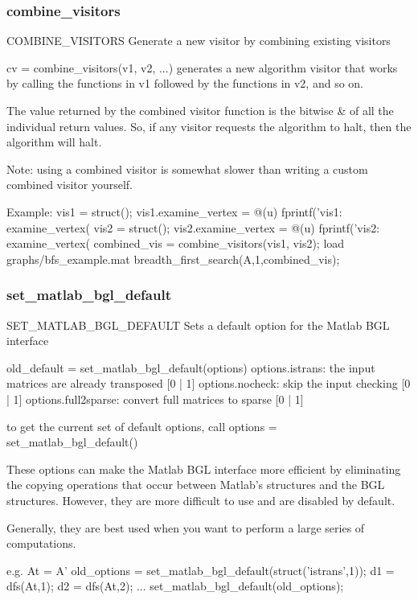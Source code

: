 \subsubsection*{combine\_visitors}
\begin{mcode}
  COMBINE_VISITORS Generate a new visitor by combining existing visitors
 
  cv = combine_visitors(v1, v2, ...) generates a new algorithm visitor that
  works by calling the functions in v1 followed by the functions in v2, and
  so on.  
 
  The value returned by the combined visitor function is the bitwise & of
  all the individual return values.  So, if any visitor requests the
  algorithm to halt, then the algorithm will halt.
 
  Note: using a combined visitor is somewhat slower than writing a custom
  combined visitor yourself.
 
  Example:
     vis1 = struct();
     vis1.examine_vertex = @(u) fprintf('vis1: examine_vertex(%
     vis2 = struct();
     vis2.examine_vertex = @(u) fprintf('vis2: examine_vertex(%
     combined_vis = combine_visitors(vis1, vis2);
     load graphs/bfs_example.mat
     breadth_first_search(A,1,combined_vis);
\end{mcode}
\newpage
\subsubsection*{set\_matlab\_bgl\_default}
\begin{mcode}
  SET_MATLAB_BGL_DEFAULT Sets a default option for the Matlab BGL interface
 
  old_default = set_matlab_bgl_default(options)
  options.istrans: the input matrices are already transposed [{0} | 1]
  options.nocheck: skip the input checking [{0} | 1]
  options.full2sparse: convert full matrices to sparse [{0} | 1]
 
  to get the current set of default options, call
  options = set_matlab_bgl_default()
 
  These options can make the Matlab BGL interface more efficient by
  eliminating the copying operations that occur between Matlab's structures
  and the BGL structures.  However, they are more difficult to use and are
  disabled by default.
 
  Generally, they are best used when you want to perform a large series of
  computations.
 
  e.g.
  At = A'
  old_options = set_matlab_bgl_default(struct('istrans',1));
  d1 = dfs(At,1); d2 = dfs(At,2); ...
  set_matlab_bgl_default(old_options);
\end{mcode}
